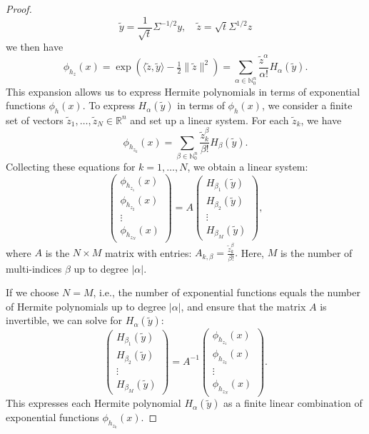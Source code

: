 \documentclass[10pt,a4paper]{amsart}
\begin{document}
\begin{proof}
\[
\tilde{y} = \frac{1}{\sqrt{t}} \Sigma^{-1/2} y, \quad \tilde{z} = \sqrt{t} \Sigma^{1/2} z
\]
we then have \[
\phi_{h_z}(x) = \exp\left( \langle \tilde{z}, \tilde{y} \rangle - \tfrac{1}{2} \| \tilde{z} \|^2 \right) = \sum_{\alpha \in \mathbb{N}_0^n} \frac{\tilde{z}^\alpha}{\alpha!} H_\alpha(\tilde{y}).
\]
This expansion allows us to express Hermite polynomials in terms of exponential functions \( \phi_h(x) \). To express \( H_\alpha(\tilde{y}) \) in terms of \( \phi_h(x) \), we consider a finite set of vectors \( \tilde{z}_1, \dots, \tilde{z}_N \in \mathbb{R}^n \) and set up a linear system. For each \( \tilde{z}_k \), we have
\[
\phi_{h_{z_k}}(x) = \sum_{\beta \in \mathbb{N}_0^n} \frac{\tilde{z}_k^\beta}{\beta!} H_\beta(\tilde{y}).
\]
Collecting these equations for \( k = 1, \dots, N \), we obtain a linear system:
\[
\begin{pmatrix}
\phi_{h_{z_1}}(x) \\
\phi_{h_{z_2}}(x) \\
\vdots \\
\phi_{h_{z_N}}(x)
\end{pmatrix}
=
A
\begin{pmatrix}
H_{\beta_1}(\tilde{y}) \\
H_{\beta_2}(\tilde{y}) \\
\vdots \\
H_{\beta_M}(\tilde{y})
\end{pmatrix},
\]
where \( A \) is the \( N \times M \) matrix with entries:
\(
A_{k, \beta} = \frac{\tilde{z}_k^\beta}{\beta!}.
\) Here, \( M \) is the number of multi-indices \( \beta \) up to degree \( |\alpha| \).

If we choose \( N = M \), i.e., the number of exponential functions equals the number of Hermite polynomials up to degree \( |\alpha| \), and ensure that the matrix \( A \) is invertible, we can solve for \( H_\alpha(\tilde{y}) \):
\[
\begin{pmatrix}
H_{\beta_1}(\tilde{y}) \\
H_{\beta_2}(\tilde{y}) \\
\vdots \\
H_{\beta_M}(\tilde{y})
\end{pmatrix}
=
A^{-1}
\begin{pmatrix}
\phi_{h_{z_1}}(x) \\
\phi_{h_{z_2}}(x) \\
\vdots \\
\phi_{h_{z_N}}(x)
\end{pmatrix}.
\]
This expresses each Hermite polynomial \( H_\alpha(\tilde{y}) \) as a finite linear combination of exponential functions \( \phi_{h_{z_k}}(x) \).


\end{proof}
\end{document}
